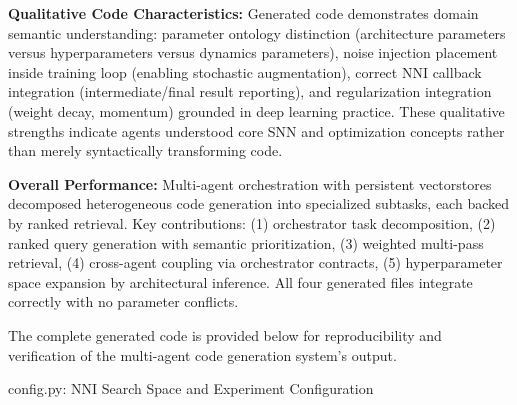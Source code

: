 \vspace{0.3cm}

\noindent \textbf{Qualitative Code Characteristics:} Generated code demonstrates domain semantic understanding: parameter ontology distinction (architecture parameters versus hyperparameters versus dynamics parameters), noise injection placement inside training loop (enabling stochastic augmentation), correct NNI callback integration (intermediate/final result reporting), and regularization integration (weight decay, momentum) grounded in deep learning practice. These qualitative strengths indicate agents understood core SNN and optimization concepts rather than merely syntactically transforming code.

\vspace{0.3cm}

\noindent \textbf{Overall Performance:} Multi-agent orchestration with persistent vectorstores decomposed heterogeneous code generation into specialized subtasks, each backed by ranked retrieval. Key contributions: (1) orchestrator task decomposition, (2) ranked query generation with semantic prioritization, (3) weighted multi-pass retrieval, (4) cross-agent coupling via orchestrator contracts, (5) hyperparameter space expansion by architectural inference. All four generated files integrate correctly with no parameter conflicts.

The complete generated code is provided below for reproducibility and verification of the multi-agent code generation system's output.

config.py: NNI Search Space and Experiment Configuration

